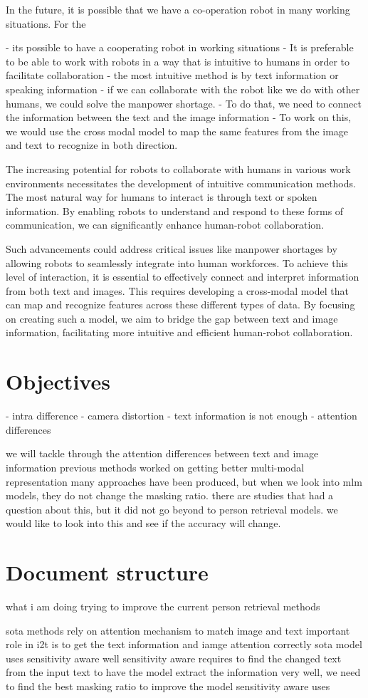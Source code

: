 In the future, it is possible that we have a co-operation robot in many working situations. For the 

- its possible to have a cooperating robot in working situations
- It is preferable to be able to work with robots in a way that is intuitive to humans in order to facilitate collaboration
- the most intuitive method is by text information or speaking information 
- if we can collaborate with the robot like we do with other humans, we could solve the manpower shortage.
- To do that, we need to connect the information between the text and the image information 
- To work on this, we would use the cross modal model to map the same features from the image and text to recognize in both direction.

The increasing potential for robots to collaborate with humans in various work environments necessitates the development of intuitive communication methods. The most natural way for humans to interact is through text or spoken information. By enabling robots to understand and respond to these forms of communication, we can significantly enhance human-robot collaboration.

Such advancements could address critical issues like manpower shortages by allowing robots to seamlessly integrate into human workforces. To achieve this level of interaction, it is essential to effectively connect and interpret information from both text and images. This requires developing a cross-modal model that can map and recognize features across these different types of data. By focusing on creating such a model, we aim to bridge the gap between text and image information, facilitating more intuitive and efficient human-robot collaboration.

\section{Objectives}
- intra difference
- camera distortion
- text information is not enough
- attention differences

we will tackle through the attention differences between text and image information
previous methods worked on getting better multi-modal representation 
many approaches have been produced, but when we look into mlm models, they do not change the masking ratio. there are studies that had a question about this, but it did not go beyond to person retrieval models. we would like to look into this and see if the accuracy will change.

\section{Document structure}

what i am doing 
trying to improve the current person retrieval methods

sota methods rely on attention mechanism to match image and text 
important role in i2t is to get the text information and iamge attention correctly 
sota model uses sensitivity aware well 
sensitivity aware requires to find the changed text from the input text 
to have the model extract the information very well, we need to find the best masking ratio to improve the model
sensitivity aware uses 
